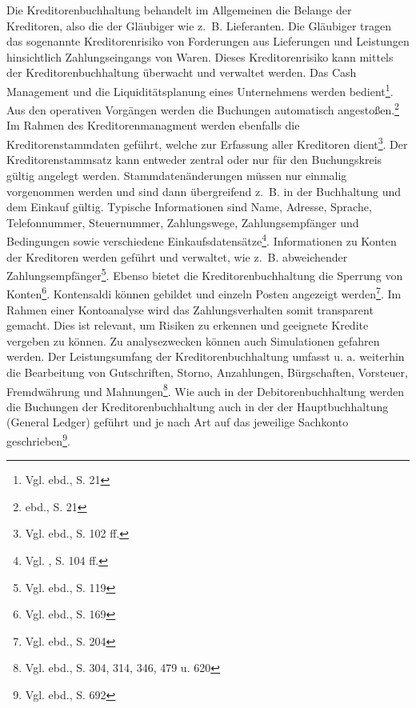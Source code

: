 Die Kreditorenbuchhaltung behandelt im Allgemeinen die Belange der Kreditoren, also die der Gläubiger wie z.~B. Lieferanten. Die Gläubiger tragen das sogenannte Kreditorenrisiko von Forderungen aus Lieferungen und Leistungen hinsichtlich Zahlungseingangs von Waren. Dieses Kreditorenrisiko kann mittels der Kreditorenbuchhaltung überwacht und verwaltet werden. Das Cash Management und die Liquiditätsplanung eines Unternehmens werden bedient\footnote{Vgl. ebd., S. 21}. \glqq Aus den operativen Vorgängen werden die Buchungen automatisch angestoßen.\grqq \footnote{ebd., S. 21} 
Im Rahmen des Kreditorenmanagment werden ebenfalls die Kreditorenstammdaten geführt, welche zur Erfassung aller Kreditoren dient\footnote{Vgl. ebd., S. 102 ff.}. Der Kreditorenstammsatz kann entweder zentral oder nur für den Buchungskreis gültig angelegt werden. Stammdatenänderungen müssen nur einmalig vorgenommen werden und sind dann übergreifend z.~B. in der Buchhaltung und dem Einkauf gültig. Typische Informationen sind Name, Adresse, Sprache, Telefonnummer, Steuernummer, Zahlungswege, Zahlungsempfänger und Bedingungen sowie verschiedene Einkaufsdatensätze\footnote{Vgl. \cite{SAPFIAPAR2001}, S. 104 ff.}.
Informationen zu Konten der Kreditoren werden geführt und verwaltet, wie z.~B. abweichender Zahlungsempfänger\footnote{Vgl. ebd., S. 119}. Ebenso bietet die Kreditorenbuchhaltung die Sperrung von Konten\footnote{Vgl. ebd., S. 169}. Kontensaldi können gebildet und einzeln Posten angezeigt werden\footnote{Vgl. ebd., S. 204}. Im Rahmen einer Kontoanalyse wird das Zahlungsverhalten somit transparent gemacht. Dies ist relevant, um Risiken zu erkennen und geeignete Kredite vergeben zu können. Zu analysezwecken können auch Simulationen gefahren werden. Der Leistungsumfang der Kreditorenbuchhaltung umfasst u. a. weiterhin die Bearbeitung von Gutschriften, Storno, Anzahlungen, Bürgschaften, Vorsteuer, Fremdwährung und Mahnungen\footnote{Vgl. ebd., S. 304, 314, 346, 479 u. 620}.
Wie auch in der Debitorenbuchhaltung werden die Buchungen der Kreditorenbuchhaltung auch in der der Hauptbuchhaltung (General Ledger) geführt und je nach Art auf das jeweilige Sachkonto geschrieben\footnote{Vgl. ebd., S. 692}.


